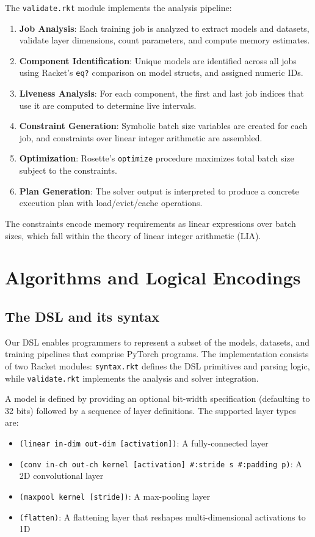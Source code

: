 \documentclass{nfr}
\begin{document}
The \texttt{validate.rkt} module implements the analysis pipeline:
\begin{enumerate}
    \item \textbf{Job Analysis}: Each training job is analyzed to extract models and datasets, validate layer dimensions, count parameters, and compute memory estimates.
    \item \textbf{Component Identification}: Unique models are identified across all jobs using Racket's \texttt{eq?} comparison on model structs, and assigned numeric IDs.
    \item \textbf{Liveness Analysis}: For each component, the first and last job indices that use it are computed to determine live intervals.
    \item \textbf{Constraint Generation}: Symbolic batch size variables are created for each job, and constraints over linear integer arithmetic are assembled.
    \item \textbf{Optimization}: Rosette's \texttt{optimize} procedure maximizes total batch size subject to the constraints.
    \item \textbf{Plan Generation}: The solver output is interpreted to produce a concrete execution plan with load/evict/cache operations.
\end{enumerate}

The constraints encode memory requirements as linear expressions over batch sizes, which fall within the theory of linear integer arithmetic (LIA).

\section{Algorithms and Logical Encodings}
\subsection{The DSL and its syntax}
Our DSL enables programmers to represent a subset of the models, datasets, and training pipelines that comprise PyTorch programs. The implementation consists of two Racket modules: \texttt{syntax.rkt} defines the DSL primitives and parsing logic, while \texttt{validate.rkt} implements the analysis and solver integration.

A model is defined by providing an optional bit-width specification (defaulting to 32 bits) followed by a sequence of layer definitions. The supported layer types are:
\begin{itemize}
    \item \texttt{(linear in-dim out-dim [activation])}: A fully-connected layer
    \item \texttt{(conv in-ch out-ch kernel [activation] \#:stride s \#:padding p)}: A 2D convolutional layer
    \item \texttt{(maxpool kernel [stride])}: A max-pooling layer
    \item \texttt{(flatten)}: A flattening layer that reshapes multi-dimensional activations to 1D
\end{itemize}
\end{document}
